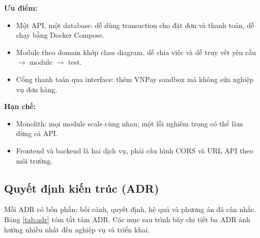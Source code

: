 \textbf{Ưu điểm:}
\begin{itemize}
\item Một API, một database: dễ dùng transaction cho đặt đơn và thanh toán, dễ chạy bằng Docker Compose.
\item Module theo domain khớp class diagram, dễ chia việc và dễ truy vết yêu cầu $\rightarrow$ module $\rightarrow$ test.
\item Cổng thanh toán qua interface: thêm VNPay sandbox mà không sửa nghiệp vụ đơn hàng.
\end{itemize}

\textbf{Hạn chế:}
\begin{itemize}
\item Monolith: mọi module scale cùng nhau; một lỗi nghiêm trọng có thể làm dừng cả API.
\item Frontend và backend là hai dịch vụ, phải cấu hình CORS và URL API theo môi trường.
\end{itemize}



\subsection{Quyết định kiến trúc (ADR)}\label{sec:adr}
Mỗi ADR có bốn phần: bối cảnh, quyết định, hệ quả và phương án đã cân nhắc. Bảng \ref{tab:adr} tóm tắt tám ADR. Các mục sau trình bày chi tiết ba ADR ảnh hưởng nhiều nhất đến nghiệp vụ và triển khai.

